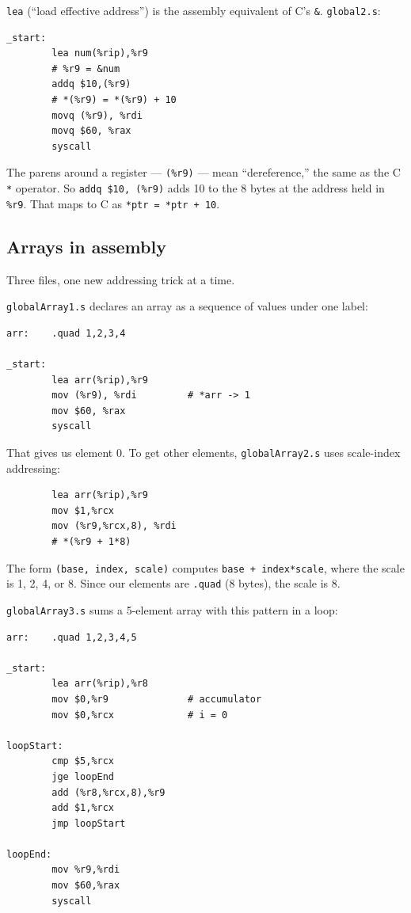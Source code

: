 \documentclass[11pt]{article}
\begin{document}
\texttt{lea} (``load effective address'') is the assembly
equivalent of C's \texttt{\&}. \texttt{global2.s}:

\begin{lstlisting}
_start:
        lea num(%rip),%r9
        # %r9 = &num
        addq $10,(%r9)
        # *(%r9) = *(%r9) + 10
        movq (%r9), %rdi
        movq $60, %rax
        syscall
\end{lstlisting}

The parens around a register --- \texttt{(\%r9)} --- mean
``dereference,'' the same as the C \texttt{*} operator. So
\texttt{addq \$10, (\%r9)} adds 10 to the 8 bytes at the address
held in \texttt{\%r9}. That maps to C as
\texttt{*ptr = *ptr + 10}.

\subsection*{Arrays in assembly}

Three files, one new addressing trick at a time.

\texttt{globalArray1.s} declares an array as a sequence of values
under one label:

\begin{lstlisting}
arr:    .quad 1,2,3,4

_start:
        lea arr(%rip),%r9
        mov (%r9), %rdi         # *arr -> 1
        mov $60, %rax
        syscall
\end{lstlisting}

That gives us element 0. To get other elements, \texttt{globalArray2.s}
uses scale-index addressing:

\begin{lstlisting}
        lea arr(%rip),%r9
        mov $1,%rcx
        mov (%r9,%rcx,8), %rdi
        # *(%r9 + 1*8)
\end{lstlisting}

The form \texttt{(base, index, scale)} computes
\texttt{base + index*scale}, where the scale is 1, 2, 4, or 8.
Since our elements are \texttt{.quad} (8 bytes), the scale is 8.

\texttt{globalArray3.s} sums a 5-element array with this pattern in
a loop:

\begin{lstlisting}
arr:    .quad 1,2,3,4,5

_start:
        lea arr(%rip),%r8
        mov $0,%r9              # accumulator
        mov $0,%rcx             # i = 0

loopStart:
        cmp $5,%rcx
        jge loopEnd
        add (%r8,%rcx,8),%r9
        add $1,%rcx
        jmp loopStart

loopEnd:
        mov %r9,%rdi
        mov $60,%rax
        syscall
\end{lstlisting}
\end{document}
